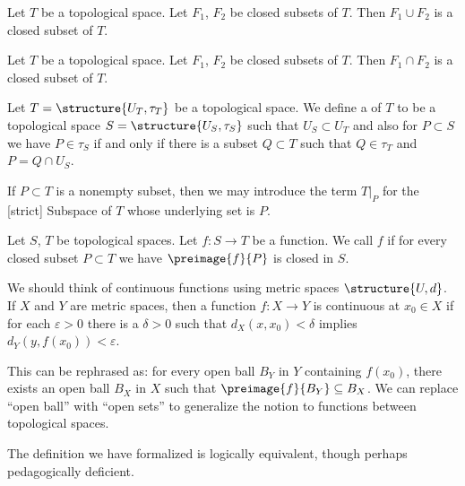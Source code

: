 \begin{theorem}
Let $T$ be a topological space. Let $F_{1}$, $F_{2}$ be closed subsets
of $T$. Then $F_{1}\cup F_{2}$ is a closed subset of $T$.
\end{theorem}

\begin{theorem}
Let $T$ be a topological space. Let $F_{1}$, $F_{2}$ be closed subsets
of $T$. Then $F_{1}\cap F_{2}$ is a closed subset of $T$.
\end{theorem}


\begin{definition}[Subspaces]
Let $T = \structure{U_{T},\tau_{T}}$ be a topological space.
We define a  of $T$ to be a topological space
$S=\structure{U_{S},\tau_{S}}$ such that $U_{S}\subset U_{T}$ and also
for $P\subset S$ we have $P\in\tau_{S}$ if and only if there is a
subset $Q\subset T$ such that $Q\in\tau_{T}$ and $P = Q\cap U_{S}$.

If $P\subset T$ is a nonempty subset, then we may introduce the term
$T|_{P}$ for the [strict] Subspace of $T$ whose underlying set is $P$.
\end{definition}



\begin{definition}
Let $S$, $T$ be topological spaces. Let $f\colon S\to T$ be a function.
We call $f$  if for every closed subset $P\subset T$
we have $\preimage{f}{P}$ is closed in $S$.
\end{definition}

\begin{remark}
We should think of continuous functions using metric spaces $\structure{U,d}$.
If $X$ and $Y$ are metric spaces, then a function $f\colon X\to Y$ is
continuous at $x_{0}\in X$ if for each $\varepsilon>0$ there is a $\delta>0$ such that 
$d_{X}(x,x_{0})<\delta$ implies $d_{Y}(y,f(x_{0}))<\varepsilon$.

This can be rephrased as: for every open ball $B_{Y}$ in $Y$
containing $f(x_{0})$, there exists an open ball $B_{X}$ in $X$ such
that $\preimage{f}{B_{Y}}\subset B_{X}$. We can replace ``open ball''
with ``open sets'' to generalize the notion to functions between
topological spaces.

The definition we have formalized is logically equivalent, though
perhaps pedagogically deficient.
\end{remark}

